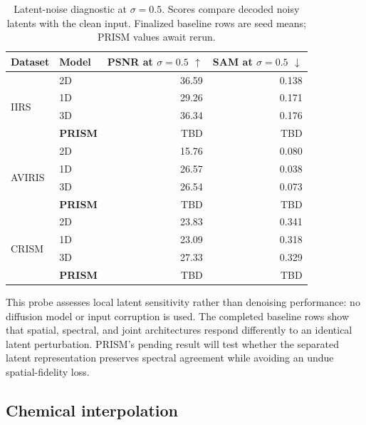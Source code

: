 \documentclass{article}
\newcommand{\tbd}{\textsc{TBD}}
\begin{document}
\begin{table}[t]
\centering
\small
\setlength{\tabcolsep}{3pt}
\begin{tabular}{llrr}
\toprule
Dataset & Model & PSNR at $\sigma=0.5$ $\uparrow$ & SAM at $\sigma=0.5$ $\downarrow$ \\
\midrule
\multirow{4}{*}{IIRS}
 & 2D & 36.59 & 0.138 \\
 & 1D & 29.26 & 0.171 \\
 & 3D & 36.34 & 0.176 \\
 & \textbf{PRISM} & \tbd{} & \tbd{} \\
\midrule
\multirow{4}{*}{AVIRIS}
 & 2D & 15.76 & 0.080 \\
 & 1D & 26.57 & 0.038 \\
 & 3D & 26.54 & 0.073 \\
 & \textbf{PRISM} & \tbd{} & \tbd{} \\
\midrule
\multirow{4}{*}{CRISM}
 & 2D & 23.83 & 0.341 \\
 & 1D & 23.09 & 0.318 \\
 & 3D & 27.33 & 0.329 \\
 & \textbf{PRISM} & \tbd{} & \tbd{} \\
\bottomrule
\end{tabular}
\caption{Latent-noise diagnostic at $\sigma=0.5$. Scores compare decoded noisy latents with the clean input. Finalized baseline rows are seed means; PRISM values await rerun.}
\label{tab:noise}
\end{table}

This probe assesses local latent sensitivity rather than denoising performance: no diffusion model or input corruption is used. The completed baseline rows show that spatial, spectral, and joint architectures respond differently to an identical latent perturbation. PRISM's pending result will test whether the separated latent representation preserves spectral agreement while avoiding an undue spatial-fidelity loss.

\subsection{Chemical interpolation}
\end{document}
